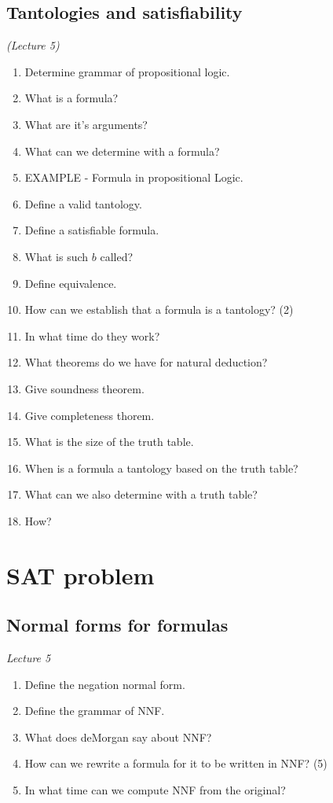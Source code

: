 \documentclass[fleqn]{article}
\begin{document}
\subsection{Tantologies and satisfiability}
\textit{(Lecture 5)}
\begin{enumerate}
    \item Determine grammar of propositional logic.
    \item What is a formula?
    \item What are it's arguments?
    \item What can we determine with a formula?
    \item EXAMPLE - Formula in propositional Logic.
    \item Define a valid tantology.
    \item Define a satisfiable formula.
    \item What is such $b$ called?
    \item Define equivalence.
    \item How can we establish that a formula is a tantology? (2)
    \item In what time do they work?
    \item What theorems do we have for natural deduction?
    \item Give soundness theorem.
    \item Give completeness thorem.
    \item What is the size of the truth table.
    \item When is a formula a tantology based on the truth table?
    \item What can we also determine with a truth table?
    \item How?
\end{enumerate}


\section{SAT problem}

\subsection{Normal forms for formulas}
\textit{Lecture 5}
\begin{enumerate}
    \item Define the negation normal form.
    \item Define the grammar of NNF.
    \item What does deMorgan say about NNF?
    \item How can we rewrite a formula for it to be written in NNF? (5) 
    \item In what time can we compute NNF from the original?
\end{enumerate}
\end{document}
